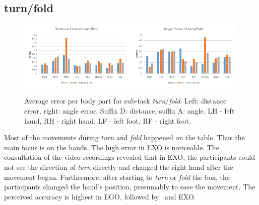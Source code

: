 \subsection{turn/fold}
\begin{figure}[H]
	\centering
	\includegraphics[width=0.49\textwidth]{figures/distanceErrorTurnFold.png}
	\includegraphics[width=0.49\textwidth]{figures/angleErrorTurnFold.png}
	\caption[Average error per body part for sub-task \textit{turn}/\textit{fold}.]{Average error per body part for sub-task \textit{turn}/\textit{fold}. Left: distance error, right: angle error. Suffix D: distance, suffix A: angle. LH - left hand, RH - right hand, LF - left foot, RF - right foot.}
	\label{fig:errorTurnFold}
\end{figure}
Most of the movements during \textit{turn} and \textit{fold} happened on the table. Thus the main focus is on the hands. The high error in EXO is noticeable. The consultation of the video recordings revealed that in EXO, the participants could not see the direction of \textit{turn} directly and changed the right hand after the movement began. Furthermore, after starting to \textit{turn} or \textit{fold} the box, the participants changed the hand's position, presumably to ease the movement. The perceived accuracy is highest in EGO, followed by \combi\ and EXO. 

